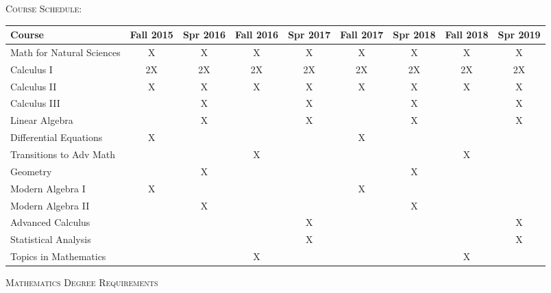 \documentclass[letterpaper,10pt]{article}
\begin{document}
\begin{minipage}[t]{.95\textwidth}
{\scshape  \Large Course Schedule:}\\[5pt]
\setlength{\extrarowheight}{2pt}
\begin{tabular}{ l | c | c | c |c |c |c |c |c |}
Course & Fall 2015 & Spr 2016 & Fall 2016 & Spr 2017 & Fall 2017 & Spr 2018 & Fall 2018 & Spr 2019\\
\hline
\hline
Math for Natural Sciences & X & X & X & X & X & X & X & X\\[2pt]
Calculus I                & 2X & 2X & 2X & 2X & 2X & 2X & 2X & 2X\\[2pt]
Calculus II               & X & X & X & X & X & X & X & X\\[2pt]
Calculus III              &  & X &  & X & & X & & X \\[2pt]
Linear Algebra            &  & X &  & X & & X & & X  \\[2pt]
Differential Equations    & X & & & & X &  &  &  \\[2pt]
Transitions to Adv Math   & & & X & & & & X &  \\[2pt]
Geometry                  & & X & & & & X & &   \\[2pt]
Modern Algebra I          & X & & & & X & & & \\[2pt]
Modern Algebra II         & & X & & & & X & &  \\[2pt]
Advanced Calculus         & & & & X & & & & X \\[2pt]
Statistical Analysis      & & & & X & & & & X \\[2pt]
Topics in Mathematics     & & & X & & & & X &  \\[2pt]
\hline
\end{tabular}
\end{minipage}
\newpage

{\scshape \Large Mathematics Degree Requirements}\\
\end{document}
